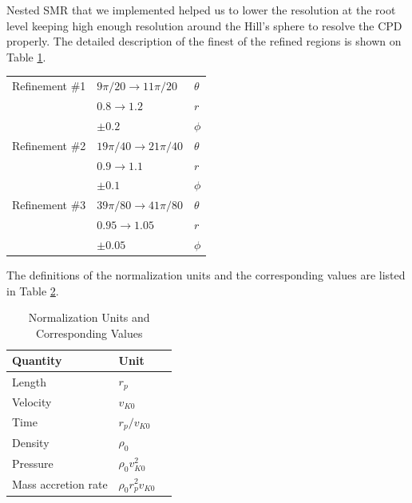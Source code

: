 \documentclass[twocolumn]{aastex631}
\begin{document}
Nested SMR that we implemented helped us to lower the resolution at the root level keeping high enough resolution around the Hill's 
sphere to resolve the CPD properly. The detailed description of the finest of the refined regions is shown on Table \ref{tab:smr}.
%
\begin{table}[]
    \label{tab:smr}
    \begin{tabular}{lll}
                   &                                 &          \\ \hline \hline
    Refinement \#1 & $9\pi/20 \rightarrow 11\pi/20$  & $\theta$ \\
                   & $0.8 \rightarrow 1.2$           & $r$      \\
                   & $\pm 0.2$                       & $\phi$   \\ \hline
    Refinement \#2 & $19\pi/40 \rightarrow 21\pi/40$ & $\theta$ \\
                   & $0.9 \rightarrow 1.1$           & $r$      \\
                   & $\pm 0.1$                       & $\phi$   \\ \hline
    Refinement \#3 & $39\pi/80 \rightarrow 41\pi/80$ & $\theta$ \\
                   & $0.95 \rightarrow 1.05$         & $r$      \\ 
                   & $\pm 0.05$                      & $\phi$  \\ \hline
    \end{tabular}
\end{table}
%
The definitions of the normalization units and the corresponding values are listed in Table \ref{tab:units}.
%
\begin{table}[]
    \label{tab:units}
    \caption{Normalization Units and Corresponding Values}
    \begin{tabular}{lll}
    \hline \hline
    Quantity            & Unit                  \\ \hline
    Length              & $r_p$                  \\
    Velocity            & $v_{K0}$                 \\
    Time                & $r_p/v_{K0}$             \\
    Density             & $\rho_0$                 \\
    Pressure            & $\rho_0 v_{K0}^2$             \\
    Mass accretion rate & $\rho_0 r_p^2 v_{K0}$               \\ \hline
    \end{tabular}
\end{table}
%
\end{document}

